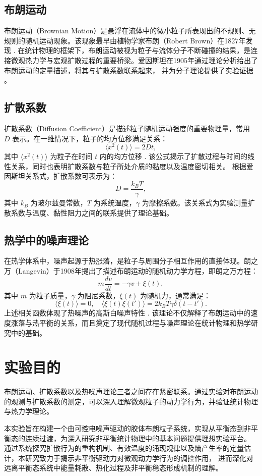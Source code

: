 \documentclass[a4paper]{report} %
\begin{document}
\subsection{布朗运动}
布朗运动（Brownian Motion）是悬浮在流体中的微小粒子所表现出的不规则、无规则的随机运动现象。该现象最早由植物学家布朗（Robert Brown）在1827年发现 \cite{brown1828}. 
在统计物理的框架下，布朗运动被视为粒子与流体分子不断碰撞的结果，是连接微观热力学与宏观扩散过程的重要桥梁。爱因斯坦在1905年通过理论分析给出了布朗运动的定量描述，将其与扩散系数联系起来，
并为分子理论提供了实验证据 \cite{einstein1905}。
\subsection{扩散系数}
扩散系数（Diffusion Coefficient）是描述粒子随机运动强度的重要物理量，常用 $D$ 表示。在一维情况下，粒子的均方位移满足关系：
\begin{equation}
\langle x^2(t) \rangle = 2Dt,
\end{equation}
其中 $\langle x^2(t) \rangle$ 为粒子在时间 $t$ 内的均方位移 \cite{uhlenbeck1930}. 该公式揭示了扩散过程与时间的线性关系，同时也表明扩散系数与粒子所处介质的黏度以及温度密切相关。
根据爱因斯坦关系式，扩散系数可表示为：
\begin{equation}
D = \frac{k_B T}{\gamma},
\end{equation}
其中 $k_B$ 为玻尔兹曼常数，$T$ 为系统温度，$\gamma$ 为摩擦系数。该关系式为实验测量扩散系数与温度、黏性阻力之间的联系提供了理论基础。

\subsection{热学中的噪声理论}
在热学体系中，噪声起源于热涨落，是粒子与周围分子相互作用的直接体现。朗之万（Langevin）于1908年提出了描述布朗运动的随机动力学方程，即朗之万方程：
\begin{equation}
m \frac{dv}{dt} = -\gamma v + \xi(t),
\end{equation}
其中 $m$ 为粒子质量，$\gamma$ 为阻尼系数，$\xi(t)$ 为随机力，通常满足：
\begin{equation}
\langle \xi(t) \rangle = 0, \quad \langle \xi(t)\xi(t') \rangle = 2k_B T \gamma \delta(t-t').
\end{equation}
上述相关函数体现了热噪声的高斯白噪声特性 \cite{kubo1966}. 该理论不仅解释了布朗运动中的速度涨落与热平衡的关系，而且奠定了现代随机过程与噪声理论在统计物理和热学研究中的基础。


\section{实验目的}
布朗运动、扩散系数以及热噪声理论三者之间存在紧密联系。通过实验对布朗运动的观测与扩散系数的测定，可以深入理解微观粒子的动力学行为，并验证统计物理与热力学理论。\par
本实验旨在构建一个由可控电噪声驱动的胶体布朗粒子系统，实现从平衡态到非平衡态的连续过渡，为深入研究非平衡统计物理中的基本问题提供理想实验平台。
通过系统探究扩散行为的重构机制、有效温度的涌现规律以及熵产生率的定量估计，本研究致力于揭示非平衡驱动力对微观动力学行为的调控作用，
进而深化对远离平衡态系统中能量耗散、热化过程及非平衡稳态形成机制的理解。
\end{document}

